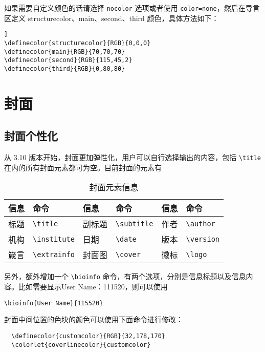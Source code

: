 \documentclass[cn,10pt,math=newtx,citestyle=gb7714-2015,bibstyle=gb7714-2015]{elegantbook}
\begin{document}
如果需要自定义颜色的话请选择 \lstinline{nocolor} 选项或者使用 \lstinline{color=none}，然后在导言区定义 structurecolor、main、second、third 颜色，具体方法如下：
\begin{lstlisting}[tabsize=4]]
\definecolor{structurecolor}{RGB}{0,0,0}
\definecolor{main}{RGB}{70,70,70}    
\definecolor{second}{RGB}{115,45,2}    
\definecolor{third}{RGB}{0,80,80}
\end{lstlisting}

\section{封面}

\subsection{封面个性化}

从 3.10 版本开始，封面更加弹性化，用户可以自行选择输出的内容，包括 \lstinline{\title} 在内的所有封面元素都可为空。目前封面的元素有

\begin{table}[htbp]
  \centering
  \caption{封面元素信息}
  \begin{tabular}{p{}p{}|p{}p{}|p{}p{}}
    \toprule
    信息 & 命令 & 信息 & 命令 & 信息 & 命令 \\
    \midrule
    标题 & \lstinline|\title| & 副标题 & \lstinline|\subtitle| & 作者 & \lstinline|\author| \\
    机构 & \lstinline|\institute| & 日期 &  \lstinline|\date| & 版本 & \lstinline|\version| \\
    箴言 & \lstinline|\extrainfo| & 封面图 & \lstinline|\cover| & 徽标 & \lstinline|\logo| \\
    \bottomrule
  \end{tabular}
\end{table}

另外，额外增加一个 \lstinline{\bioinfo} 命令，有两个选项，分别是信息标题以及信息内容。比如需要显示{\kaishu User Name：111520}，则可以使用 
\begin{lstlisting}
\bioinfo{User Name}{115520}
\end{lstlisting}

封面中间位置的色块的颜色可以使用下面命令进行修改：
\begin{lstlisting}
  \definecolor{customcolor}{RGB}{32,178,170}
  \colorlet{coverlinecolor}{customcolor}
\end{lstlisting}
\end{document}
